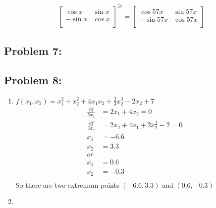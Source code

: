\documentclass{article}
\begin{document}
\begin{align*} 
&\left[   \begin{array}{cc} 
\cos x & \sin x \\ 
-\sin x & \cos x \\ 
\end{array}  \right]^{57} = \left[   \begin{array}{cc} 
\cos 57x & \sin 57x \\ 
-\sin 57x & \cos 57x \\ 
\end{array}  \right]
\end{align*}

\hypertarget{}{}
\subsection*{{Problem 7: }}
\label{}


\hypertarget{}{}
\subsection*{{Problem 8: }}
\label{}
\begin{enumerate}
\item
$f(x_1, x_2) = x_1^2 + x_2^2 + 4x_1x_2 +\frac{2}{3}x_2^3-2x_2 + 7$ \\
\begin{align*}
\frac{\partial f}{\partial x_1} &= 2x_1+4x_2 = 0\\
\frac{\partial f}{\partial x_2} &= 2x_2 +4x_1 + 2x_2^2 - 2 = 0 \\
 x_1 &= -6.6 \\ x_2 & = 3.3 \\
 or \\
 x_1 & = 0.6 \\ x_2 & = -0.3 \\
\end{align*}
So there are two extremum points $(-6.6, 3.3) $ and $(0.6, -0.3) $ 
\item 

\end{enumerate}

\hypertarget{}{}
\end{document}
